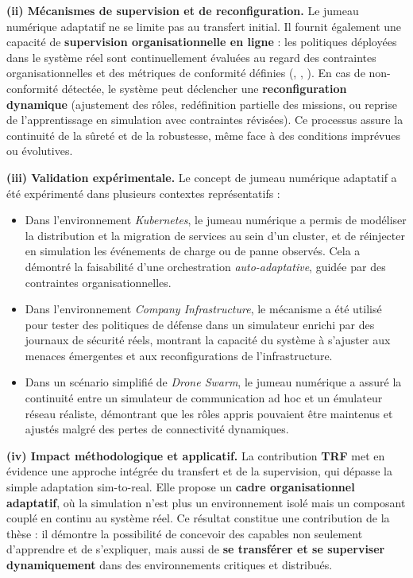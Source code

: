 \medskip
\noindent
\textbf{(ii) Mécanismes de supervision et de reconfiguration.}
Le jumeau numérique adaptatif ne se limite pas au transfert initial.
Il fournit également une capacité de \textbf{supervision organisationnelle en ligne} :
les politiques déployées dans le système réel sont continuellement évaluées au regard des contraintes organisationnelles et des métriques de conformité définies (, , ).
En cas de non-conformité détectée, le système peut déclencher une \textbf{reconfiguration dynamique} (ajustement des rôles, redéfinition partielle des missions, ou reprise de l'apprentissage en simulation avec contraintes révisées).
Ce processus assure la continuité de la sûreté et de la robustesse, même face à des conditions imprévues ou évolutives.

\medskip
\noindent
\textbf{(iii) Validation expérimentale.}
Le concept de jumeau numérique adaptatif a été expérimenté dans plusieurs contextes représentatifs :
\begin{itemize}
  \item Dans l'environnement \textit{Kubernetes}, le jumeau numérique a permis de modéliser la distribution et la migration de services au sein d'un cluster, et de réinjecter en simulation les événements de charge ou de panne observés. Cela a démontré la faisabilité d'une orchestration \textit{auto-adaptative}, guidée par des contraintes organisationnelles.
  \item Dans l'environnement \textit{Company Infrastructure}, le mécanisme a été utilisé pour tester des politiques de défense dans un simulateur enrichi par des journaux de sécurité réels, montrant la capacité du système à s'ajuster aux menaces émergentes et aux reconfigurations de l'infrastructure.
  \item Dans un scénario simplifié de \textit{Drone Swarm}, le jumeau numérique a assuré la continuité entre un simulateur de communication ad hoc et un émulateur réseau réaliste, démontrant que les rôles appris pouvaient être maintenus et ajustés malgré des pertes de connectivité dynamiques.
\end{itemize}

\medskip
\noindent
\textbf{(iv) Impact méthodologique et applicatif.}
La contribution \textbf{TRF} met en évidence une approche intégrée du transfert et de la supervision, qui dépasse la simple adaptation sim-to-real.
Elle propose un \textbf{cadre organisationnel adaptatif}, où la simulation n'est plus un environnement isolé mais un composant couplé en continu au système réel.
Ce résultat constitue une contribution de la thèse : il démontre la possibilité de concevoir des  capables non seulement d'apprendre et de s'expliquer, mais aussi de \textbf{se transférer et se superviser dynamiquement} dans des environnements critiques et distribués.


